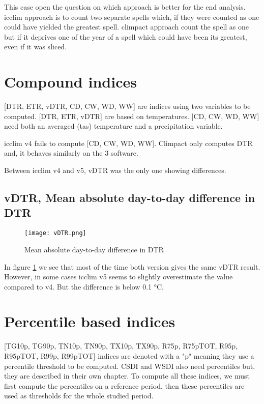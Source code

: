 \documentclass[a4paper,11pt]{article}
\begin{document}
        This case open the question on which approach is better for the end analysis.
        icclim approach is to count two separate spells which, if they were counted as one could have yielded the greatest spell.
        climpact approach count the spell as one but if it deprives one of the year of a spell which could have been its greatest, even if it was 
        sliced.
    


    \section{Compound indices}
        [DTR, ETR, vDTR, CD, CW, WD, WW] are indices using two variables to be computed.
        [DTR, ETR, vDTR] are based on temperatures.
        [CD, CW, WD, WW] need both an averaged (tas) temperature and a precipitation variable.
        
        icclim v4 fails to compute [CD, CW, WD, WW].
        Climpact only computes DTR and, it behaves similarly on the 3 software. 

        Between icclim v4 and v5, vDTR was the only one showing differences.

        \subsection{vDTR, Mean absolute day-to-day difference in DTR}
            \begin{figure}[!hbt]
                \centering
                \texttt{[image: vDTR.png]}
                \caption{Mean absolute day-to-day difference in DTR}
                \label{figure/vdtr}
            \end{figure}
            In figure \ref{figure/vdtr} we see that most of the time both version gives the same vDTR result.
            However, in some cases icclim v5 seems to slightly overestimate the value compared to v4. But the difference is below 0.1 °C.

    \section{Percentile based indices}
        [TG10p, TG90p, TN10p, TN90p, TX10p, TX90p, R75p, R75pTOT, R95p, R95pTOT, R99p, R99pTOT] indices are denoted with a "p" meaning they use a percentile threshold to be computed. CSDI and WSDI also need percentiles but, they are described in their own chapter.
        To compute all these indices, we must first compute the percentiles on a reference period, then these percentiles are used as thresholds for the whole studied period.
\end{document}
